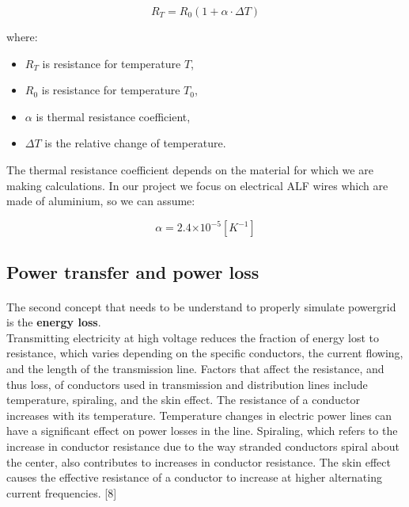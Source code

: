 \documentclass[a4paper]{article}
\providecommand{\e}[1]{\ensuremath{\times 10^{#1}}}
\begin{document}
\begin{equation}
R_T=R_0(1+\alpha \cdot \Delta T)
\end{equation}

where:
\begin{itemize}
	\setlength{\itemsep}{1pt}
	\setlength{\parskip}{0pt}
	\setlength{\parsep}{0pt}
\item $R_T$ is resistance for temperature $T$,
\item $R_0$ is resistance for temperature $T_0$,
\item $\alpha$ is thermal resistance coefficient,
\item $\Delta T$ is the relative change of temperature.\\
\end{itemize}

The thermal resistance coefficient depends on the material for which we are making calculations. In our project we focus on electrical ALF wires which are made of aluminium, so we can assume:

\begin{equation}
\alpha = 2.4\e{-5} [K^{-1}]
\end{equation}

\subsection{Power transfer and power loss}
\label{sec:powerTransferAndPowerLoss}
\paragraph{}

The second concept that needs to be understand to properly simulate powergrid is the \textbf{energy loss}.\\ 

Transmitting electricity at high voltage reduces the fraction of energy lost to resistance, which varies depending on the specific conductors, the current flowing, and the length of the transmission line. Factors that affect the resistance, and thus loss, of conductors used in transmission and distribution lines include temperature, spiraling, and the skin effect. The resistance of a conductor increases with its temperature. Temperature changes in electric power lines can have a significant effect on power losses in the line. Spiraling, which refers to the increase in conductor resistance due to the way stranded conductors spiral about the center, also contributes to increases in conductor resistance. The skin effect causes the effective resistance of a conductor to increase at higher alternating current frequencies. [8]\\
\end{document}
